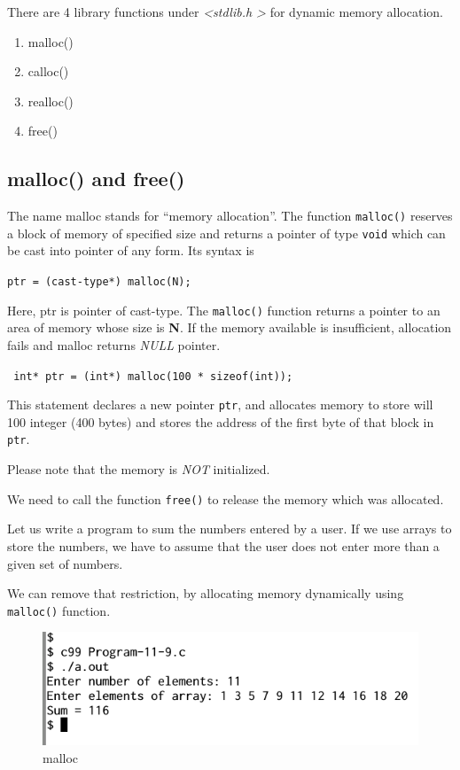 \documentclass[11pt,a4paper]{article}
\begin{document}
There are 4 library functions under \emph{\textless stdlib.h \textgreater} for dynamic memory allocation.
\begin{enumerate}
\item malloc()
\item calloc()
\item realloc()
\item free()
\end{enumerate}

\subsection*{malloc() and free()}
The name malloc stands for ``memory allocation''. The function \texttt{malloc()} reserves a block of memory of specified size and returns a pointer of type \lstinline!void! which can be cast into pointer of any form. Its syntax is 

\texttt{ptr = (cast-type*) malloc(N);} 

Here, ptr is pointer of cast-type. The \texttt{malloc()} function returns a pointer to an area of memory whose size is \textbf{N}. If the memory available is insufficient, allocation fails and malloc returns \emph{NULL} pointer. 

\lstinline! int* ptr = (int*) malloc(100 * sizeof(int));! 

This statement declares a new pointer \texttt{ptr}, and allocates memory to store will 100 integer (400 bytes) and stores the address of the first byte of that block in \texttt{ptr}.

Please note that the memory is \emph{NOT} initialized. 

We need to call the function \texttt{free()} to release the memory which was allocated.

Let us write a program to sum the numbers entered by a user. If we use arrays to store the numbers, we have to assume that the user does not enter more than a given set of numbers.

We can remove that restriction, by allocating memory dynamically using \texttt{malloc()} function.



\begin{figure}[ht]
\begin{center}
\includegraphics[scale=0.6]{Output-11-9.png}
\caption{malloc}
\label{output-11-9}
\end{center}
\end{figure}
\end{document}
